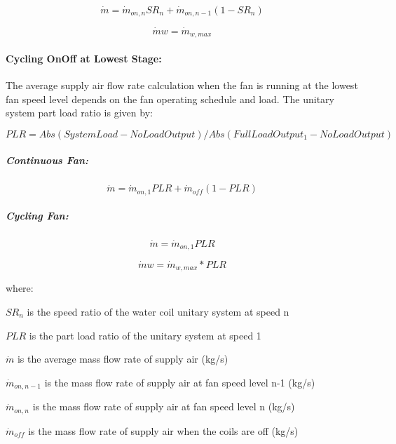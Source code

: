 \begin{equation}
  {\dot m} = {\dot m_{on, n}} {SR_{n}} + {\dot m_{on, n-1}} (1 - {SR_{n}})
\end{equation}

\begin{equation}
  {\dot m{w}} = {\dot m_{w, max}}
\end{equation}

\paragraph{Cycling OnOff at Lowest Stage:}\label{cycling-onoff-at-lowest-stage}

The average supply air flow rate calculation when the fan is running at the lowest fan speed level depends on the fan operating schedule and load. The unitary system part load ratio is given by:

\begin{equation}
{PLR} = Abs({SystemLoad} - {NoLoadOutput}) / Abs({FullLoadOutput_{1}} - {NoLoadOutput})
\end{equation}

\subparagraph{Continuous Fan:}\label{continuous-fan}

\begin{equation}
{\dot m} = {\dot m_{on, 1}} {PLR} + {\dot m_{off}} (1 - {PLR})
\end{equation}

\subparagraph{Cycling Fan:}\label{cycling-fan}

\begin{equation}
  {\dot m} = {\dot m_{on, 1}} {PLR}
\end{equation}

\begin{equation}
  {\dot m{w}} = {\dot m_{w, max}} * {PLR}
\end{equation}

where:

$SR_n$ is the speed ratio of the water coil unitary system at speed n

$PLR$ is the part load ratio of the unitary system at speed 1

$\dot{m}$ is the average mass flow rate of supply air (kg/s)

$\dot{m}_{on, n-1}$ is the mass flow rate of supply air at fan speed level n-1 (kg/s)

$\dot{m}_{on, n}$ is the mass flow rate of supply air at fan speed level n (kg/s)

$\dot{m}_{off}$ is the mass flow rate of supply air when the coils are off (kg/s)

